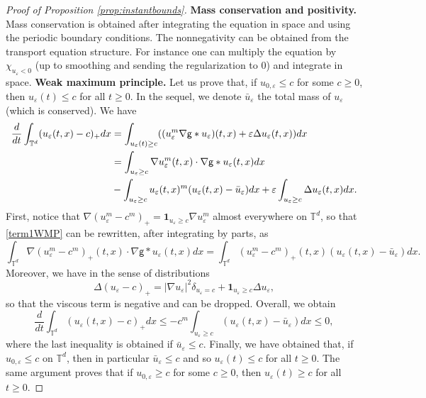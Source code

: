 \documentclass[11pt]{article}
\numberwithin{equation}{section} %
\renewcommand{\d}{\delta}
\newcommand{\T}{{\mathbb{T}}}
\newcommand{\g}{{\mathsf{g}}}
\newcommand{\eps}{\varepsilon}
\newcommand{\D}{\Delta}
\newcommand{\ep}{\varepsilon}
\let\div\relax
\DeclareMathOperator{\div}{\mathsf{div}}
\def \ep{\varepsilon}
\def\nab{\nabla}
\def\indic{\mathbf{1}}
\begin{document}
\begin{proof}[Proof of Proposition \ref{prop:instantbounds}]  
\textbf{Mass conservation and positivity.} 
Mass conservation is obtained after integrating the equation in space and using the periodic boundary conditions. The nonnegativity can be obtained from the transport equation structure. For instance one can multiply the equation by $\chi_{u_{\eps}<0}$ (up to smoothing and sending the regularization to 0) and integrate in space.
\bigbreak
\textbf{Weak maximum principle.} Let us prove that, if $u_{0,\ep} \le c$ for some $c\ge 0$, then $u_\ep(t)\le c$ for all $t\ge 0$. In the sequel, we denote $\bar u_\ep$ the total mass of $u_\ep$ (which is conserved). We have
    \begin{align}
        \frac{d}{dt}\int_{\T^d} (u_\ep(t,x) - c)_+dx &=  \int_{u_\ep(t) \ge c} (\div(u_\ep^m\nab\g\ast u_\ep)(t,x) + \ep \D u_\ep(t,x))dx\nonumber \\
        &= \int_{u_\ep\ge c} \nab u_\ep^m(t,x)\cdot\nab\g\ast u_\ep (t,x) dx \label{term1WMP}\\
        &- \int_{u_\ep \ge c} u_\ep(t,x)^m(u_\ep(t,x) - \bar u_\ep) dx + \ep \int_{u_\ep\ge c} \D u_\ep(t,x) dx.\nonumber
    \end{align}
    First, notice that $\nab (u_\ep^m -c^m)_+ = \indic_{u_\ep \ge c} \nab u_\ep^m$ almost everywhere on $\T^d$, so that \eqref{term1WMP} can be rewritten, after integrating by parts, as
    \begin{equation*}
        \int_{\T^d} \nab (u_\ep^m -c^m)_+(t,x) \cdot \nab\g\ast u_\ep(t,x)dx = \int_{\T^d} (u_\ep^m -c^m)_+(t,x) (u_\ep(t,x)-\bar u_\ep )dx.
    \end{equation*}
    Moreover, we have in the sense of distributions
    \begin{equation*}
        \D (u_\ep - c)_+= |\nab u_\ep|^2 \d_{u_\ep = c} + \indic_{u_\ep \ge c} \D u_\ep,
    \end{equation*}
    so that the viscous term is negative and can be dropped. Overall, we obtain
    \begin{equation*}
        \frac{d}{dt}\int_{\T^d} (u_\ep(t,x) - c)_+dx \le -c^m\int_{u_\ep\ge c} (u_\ep(t,x) -\bar u_\ep )dx \le 0,
    \end{equation*}
    where the last inequality is obtained if $ \bar u_\ep \le c$. Finally, we have obtained that, if $u_{0,\ep} \le c$ on $\T^d$, then in particular $\bar u_\ep \le c$ and so $u_\ep(t)\le c$ for all $t\ge 0$. The same argument proves that if $u_{0,\ep}\ge c$ for some $c\ge 0$, then $u_\ep(t)\ge c$ for all $t\ge 0$.


\end{proof}
\end{document}
